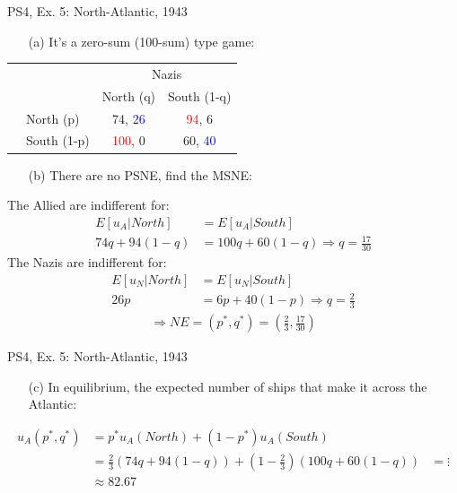 \begin{frame}{PS4, Ex. 5: North-Atlantic, 1943}
    \begin{itemize}
      \item[(a)] It's a zero-sum (100-sum) type game:
    \end{itemize}
    \vspace{-15pt}
    \hspace{-15pt}\begin{table}
      \begin{tabular}{cl|c|c|}
          & \multicolumn{1}{c}{} & \multicolumn{2}{c}{\color{blue}Nazis}\\
          \parbox[t]{1mm}{}
          &  &  &  \\
          & North (p)    & 74, \textcolor{blue}{26} & \textcolor{red}{94}, 6 \\
          & South (1-p)  & \textcolor{red}{100}, 0 & 60, \textcolor{blue}{40} \\
      \end{tabular}
    \end{table}
    \begin{itemize}
      \item[(b)] There are no PSNE, find the MSNE:
    \end{itemize}
    The Allied are indifferent for:
    \begin{align*}
      E[u_A|North]&=E[u_A|South]\\
      74q + 94(1-q) &= 100q + 60(1-q) \Rightarrow q = \frac{17}{30}
    \end{align*}
    The Nazis are indifferent for:
    \begin{align*}
      E[u_N|North]&=E[u_N|South]\\
      26p &= 6p + 40(1-p) \Rightarrow q = \frac{2}{3}
    \end{align*}
    \begin{align*}
      \Rightarrow NE=(p^{*},q^{*})=\left(\frac{2}{3},\frac{17}{30}\right)
    \end{align*}
\end{frame}
\begin{frame}{PS4, Ex. 5: North-Atlantic, 1943}
  \begin{itemize}
    \item[(c)] In equilibrium, the expected number of ships that make it across the Atlantic:
  \end{itemize}
  \begin{align*}
     u_A(p^{*},q^{*}) &= p^{*}u_A(North)+(1-p^{*})u_A(South)\\
     &= \frac{2}{3}(74q + 94(1-q)) + \left(1-\frac{2}{3}\right)(100q + 60(1-q))
     &= \vdots \\
     &\approx 82.67
  \end{align*}
\end{frame}


